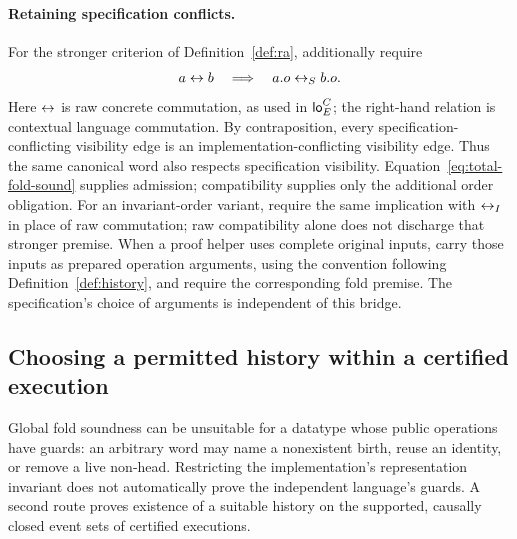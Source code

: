 \paragraph{Retaining specification conflicts.}
For the stronger criterion of Definition~\ref{def:ra}, additionally require
\begin{equation}
 a\leftrightarrow b
 \quad\Longrightarrow\quad
 a.o\mathrel{\leftrightarrow_{S}} b.o.
 \label{eq:commutation-compatibility}
\end{equation}
Here $\leftrightarrow$ is raw concrete commutation, as used in $\mathsf{lo}^{C}_{E}$; the right-hand relation is contextual language commutation.
By contraposition, every specification-conflicting visibility edge is an
implementation-conflicting visibility edge. Thus the same canonical word also
respects specification visibility. Equation~\eqref{eq:total-fold-sound} supplies
admission; compatibility supplies only the additional order obligation.
For an invariant-order variant, require the same implication with $\leftrightarrow_I$
in place of raw commutation; raw compatibility alone does not discharge that
stronger premise. When a proof helper uses complete original inputs,
carry those inputs as prepared operation arguments, using the convention
following Definition~\ref{def:history}, and require the corresponding fold premise.
The specification's choice of arguments is independent of this bridge.

\subsection{Choosing a permitted history within a certified execution}

Global fold soundness can be unsuitable for a datatype whose public operations
have guards: an arbitrary word may name a nonexistent birth, reuse an identity,
or remove a live non-head. Restricting the implementation's representation
invariant does not automatically prove the independent language's guards.
A second route proves existence of a suitable history on the supported,
causally closed event sets of certified executions.

